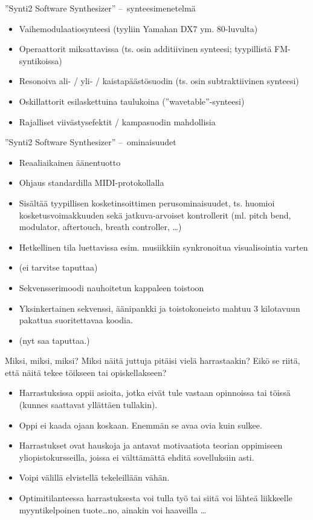 \documentclass[pdf,10pt,handout]{beamer}
\begin{document}
\begin{frame}{''Synti2 Software Synthesizer'' --~synteesimenetelmä}

  \begin{itemize}
  \item Vaihemodulaatiosynteesi (tyyliin Yamahan DX7 ym. 80-luvulta)
  \item Operaattorit miksattavissa (ts. osin additiivinen synteesi;
    tyypillistä FM-syntikoissa)
  \item Resonoiva ali- / yli- / kaistapäästösuodin (ts. osin
    subtraktiivinen synteesi)
  \item Oskillattorit esilaskettuina taulukoina
    (''wavetable''-synteesi)
  \item Rajalliset viivästysefektit / kampasuodin mahdollisia
  \end{itemize}
\end{frame}

\begin{frame}{''Synti2 Software Synthesizer'' --~ominaisuudet}
  \begin{itemize}
  \item Reaaliaikainen äänentuotto 
  \item Ohjaus standardilla MIDI-protokollalla
  \item Sisältää tyypillisen kosketinsoittimen perusominaisuudet,
    ts. huomioi kosketusvoimakkuuden sekä jatkuva-arvoiset
    kontrollerit (ml. pitch bend, modulator, aftertouch, breath
    controller, \ldots)
  \item Hetkellinen tila luettavissa esim. musiikkiin synkronoitua
    visualisointia varten
  \item[] (ei tarvitse taputtaa)
  \item Sekvensserimoodi nauhoitetun kappaleen toistoon
  \item Yksinkertainen sekvenssi, äänipankki ja toistokoneisto mahtuu
    3 kilotavuun pakattua suoritettavaa koodia.
  \item[] (nyt saa taputtaa.)
  \end{itemize}
\end{frame}

\begin{frame}{Miksi, miksi, miksi?}
  Miksi näitä juttuja pitäisi vielä harrastaakin? Eikö se riitä, että
  näitä tekee töikseen tai opiskellakseen?
  \begin{itemize}
    \item Harrastuksissa oppii asioita, jotka eivät tule vastaan
      opinnoissa tai töissä (kunnes saattavat yllättäen tullakin).
    \item Oppi ei kaada ojaan koskaan. Enemmän se avaa ovia kuin
      sulkee.
    \item Harrastukset ovat hauskoja ja antavat motivaatiota teorian
      oppimiseen yliopistokursseilla, joissa ei välttämättä ehditä
      sovelluksiin asti.
    \item Voipi välillä elvistellä tekeleillään vähän.
    \item Optimitilanteessa harrastuksesta voi tulla työ tai siitä voi
      lähteä liikkeelle myyntikelpoinen tuote\ldots no, ainakin voi
      haaveilla \ldots
  \end{itemize}
\end{frame}
\end{document}
